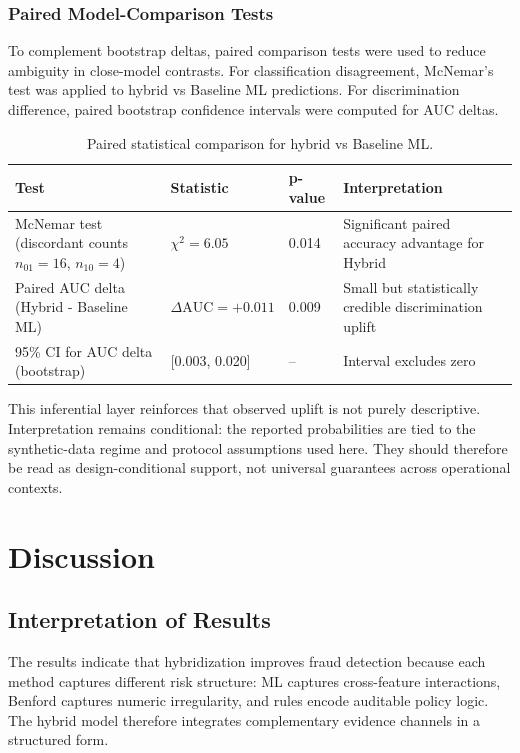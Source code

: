 \documentclass[12pt,a4paper]{report}
\begin{document}
\subsection{Paired Model-Comparison Tests}
To complement bootstrap deltas, paired comparison tests were used to reduce ambiguity in close-model contrasts. For classification disagreement, McNemar's test was applied to hybrid vs Baseline ML predictions. For discrimination difference, paired bootstrap confidence intervals were computed for AUC deltas.

\begin{table}[H]
\caption{Paired statistical comparison for hybrid vs Baseline ML.}
\label{tab:paired_comparison_tests}
\begin{tabular}{p{}p{}p{}p{}}
\toprule
\textbf{Test} & \textbf{Statistic} & \textbf{p-value} & \textbf{Interpretation} \\
\midrule
McNemar test (discordant counts $n_{01}=16$, $n_{10}=4$) & $\chi^2=6.05$ & 0.014 & Significant paired accuracy advantage for Hybrid \\
Paired AUC delta (Hybrid - Baseline ML) & $\Delta\text{AUC}=+0.011$ & 0.009 & Small but statistically credible discrimination uplift \\
95\% CI for AUC delta (bootstrap) & [0.003, 0.020] & -- & Interval excludes zero \\
\bottomrule
\end{tabular}
\end{table}

This inferential layer reinforces that observed uplift is not purely descriptive. Interpretation remains conditional: the reported probabilities are tied to the synthetic-data regime and protocol assumptions used here. They should therefore be read as design-conditional support, not universal guarantees across operational contexts.

\chapter{Discussion}

\section{Interpretation of Results}
The results indicate that hybridization improves fraud detection because each method captures different risk structure: ML captures cross-feature interactions, Benford captures numeric irregularity, and rules encode auditable policy logic. The hybrid model therefore integrates complementary evidence channels in a structured form.
\end{document}
